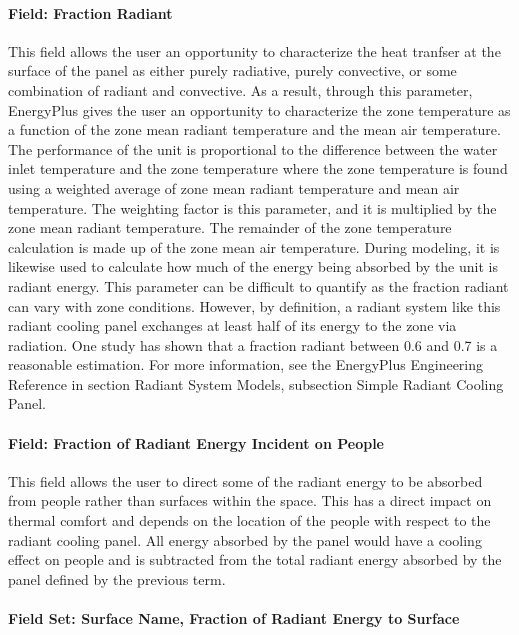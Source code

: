 \paragraph{Field: Fraction Radiant}\label{field-fraction-radiant-2-000-1}

This field allows the user an opportunity to characterize the heat tranfser at the surface of the panel as either purely radiative, purely convective, or some combination of radiant and convective.  As a result, through this parameter, EnergyPlus gives the user an opportunity to characterize the zone temperature as a function of the zone mean radiant temperature and the mean air temperature.  The performance of the unit is proportional to the difference between the water inlet temperature and the zone temperature where the zone temperature is found using a weighted average of zone mean radiant temperature and mean air temperature.  The weighting factor is this parameter, and it is multiplied by the zone mean radiant temperature.  The remainder of the zone temperature calculation is made up of the zone mean air temperature.  During modeling, it is likewise used to calculate how much of the energy being absorbed by the unit is radiant energy.  This parameter can be difficult to quantify as the fraction radiant can vary with zone conditions.  However, by definition, a radiant system like this radiant cooling panel exchanges at least half of its energy to the zone via radiation.  One study has shown that a fraction radiant between 0.6 and 0.7 is a reasonable estimation.  For more information, see the EnergyPlus Engineering Reference in section Radiant System Models, subsection Simple Radiant Cooling Panel.

\paragraph{Field: Fraction of Radiant Energy Incident on People}\label{field-fraction-of-radiant-energy-incident-on-people-2-1}

This field allows the user to direct some of the radiant energy to be absorbed from people rather than surfaces within the space.  This has a direct impact on thermal comfort and depends on the location of the people with respect to the radiant cooling panel.  All energy absorbed by the panel would have a cooling effect on people and is subtracted from the total radiant energy absorbed by the panel defined by the previous term.

\paragraph{Field Set: Surface Name, Fraction of Radiant Energy to Surface}\label{field-set-surface-name-fraction-of-radiant-energy-to-surface-2-1}

